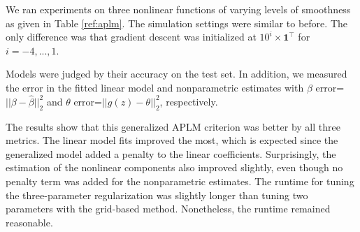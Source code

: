 \documentclass[10pt,letterpaper]{article}
\begin{document}
We ran experiments on three nonlinear functions of varying levels of smoothness as given in Table \ref{ref:aplm}. The simulation settings were similar to before. The only difference was that gradient descent was initialized at $10^i \times \boldsymbol 1^\top$ for $i=-4, ..., 1$.

Models were judged by their accuracy on the test set. In addition, we measured the error in the fitted linear model and nonparametric estimates with $\beta$ error=$||\beta - \hat \beta||_2^2$ and $\theta$ error=$|| g(z) - \theta ||_2^2$, respectively.

The results show that this generalized APLM criterion was better by all three metrics. The linear model fits improved the most, which is expected since the generalized model added a penalty to the linear coefficients. Surprisingly, the estimation of the nonlinear components also improved slightly, even though no penalty term was added for the nonparametric estimates. The runtime for tuning the three-parameter regularization was slightly longer than tuning two parameters with the grid-based method. Nonetheless, the runtime remained reasonable.

\end{document}

